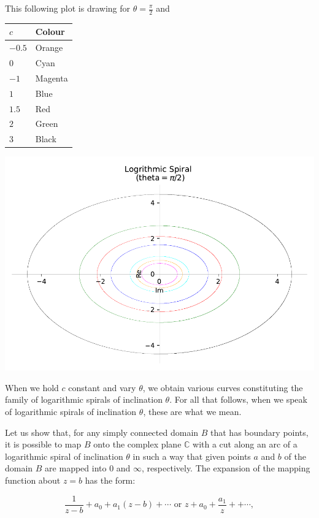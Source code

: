 \documentclass[
]{book}
\theoremstyle{definition}
\theoremstyle{definition}
\theoremstyle{definition}
\theoremstyle{definition}
\theoremstyle{remark}
\begin{document}
This following plot is drawing for \(\theta=\frac{\pi}{2}\) and

\begin{longtable}[]{@{}ll@{}}
\toprule\noalign{}
\(c\) & Colour \\
\midrule\noalign{}
\endhead
\bottomrule\noalign{}
\endlastfoot
\(-0.5\) & Orange \\
\(0\) & Cyan \\
\(-1\) & Magenta \\
\(1\) & Blue \\
\(1.5\) & Red \\
\(2\) & Green \\
\(3\) & Black \\
\end{longtable}

\includegraphics{ConformalMapping_files/figure-latex/unnamed-chunk-71-1.pdf}

When we hold \(c\) constant and vary \(\theta\), we obtain various curves constituting the family of logarithmic spirals of inclination \(\theta\). For all that follows, when we speak of logarithmic spirals of inclination \(\theta\), these are what we mean.

Let us show that, for any simply connected domain \(B\) that has boundary points, it is possible to map \(B\) onto the complex plane \(\mathbb{C}\) with a cut along an arc of a logarithmic spiral of inclination \(\theta\) in such a way that given points \(a\) and \(b\) of the domain \(B\) are mapped into \(0\) and \(\infty\), respectively. The expansion of the mapping function about \(z = b\) has the form:

\[ \frac{1}{z - b} +a_0+a_1{(z - b)} +\cdots\text{ or }  z+a_0+\frac{a_1}{z} +  + \cdots, \]
\end{document}
